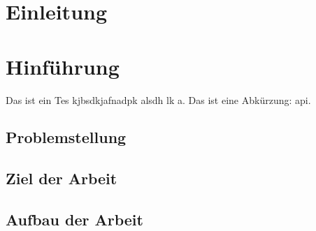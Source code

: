 \section{Einleitung}

\section{Hinführung}
Das ist ein Tes \cite{broy_vorgehen_2021} kjbsdkjafnadpk alsdh lk a. Das ist eine Abkürzung: \ac{api}.
    
        
\subsection{Problemstellung}
    
    
\subsection{Ziel der Arbeit}
    
    
\subsection{Aufbau der Arbeit}
    
